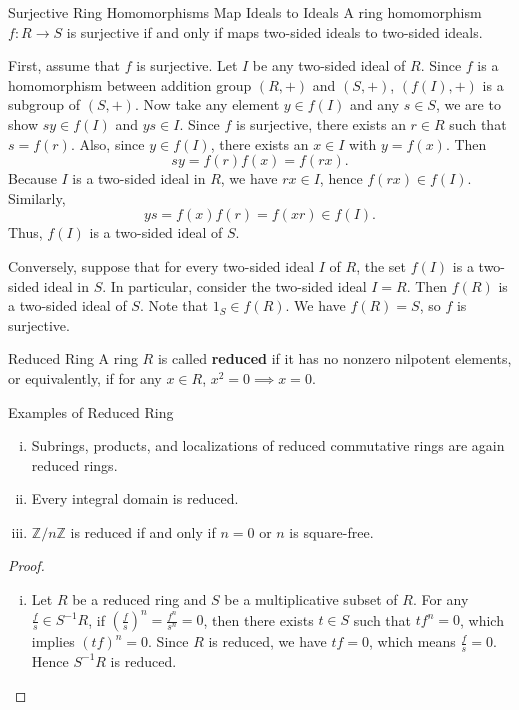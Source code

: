 \begin{proposition}{Surjective Ring Homomorphisms Map Ideals to Ideals}{}
    A ring homomorphism $f:R\to S$ is surjective if and only if maps two-sided ideals to two-sided ideals.
\end{proposition}
\begin{prf}
    First, assume that \( f \) is surjective. Let \( I \) be any two-sided ideal of \( R \). Since $f$ is a homomorphism between addition group $(R,+)$ and $(S,+)$, $(f(I),+)$ is a subgroup of $(S,+)$. Now take any element \( y \in f(I) \) and any \( s \in S \), we are to show $sy\in f(I)$ and $ys\in I$. Since \( f \) is surjective, there exists an \( r \in R \) such that \( s = f(r) \). Also, since \( y \in f(I) \), there exists an \( x \in I \) with \( y = f(x) \). Then
\[
s y = f(r) f(x) = f(rx).
\]
Because \( I \) is a two-sided ideal in \( R \), we have \( rx \in I \), hence \( f(rx) \in f(I) \). Similarly,
\[
y s = f(x) f(r) = f(xr) \in f(I).
\]
Thus, \( f(I) \) is a two-sided ideal of \( S \).

Conversely, suppose that for every two-sided ideal \( I \) of \( R \), the set \( f(I) \) is a two-sided ideal in \( S \). In particular, consider the two-sided ideal \( I = R \). Then \( f(R) \) is a two-sided ideal of \( S \). Note that \(1_S\in f(R) \). We have \( f(R) = S \), so \( f \) is surjective.

\end{prf}



\begin{definition}{Reduced Ring}{}
    A ring $R$ is called \textbf{reduced} if it has no nonzero nilpotent elements, or equivalently, if for any $x\in R$, $x^2=0\implies x=0$.
\end{definition}


\begin{proposition}{Examples of Reduced Ring}{}
    \begin{enumerate}[(i)]
        \item Subrings, products, and localizations of reduced commutative rings are again reduced rings.
        \item Every integral domain is reduced.
        \item $\mathbb{Z}/n\mathbb{Z}$ is reduced if and only if $n=0$ or $n$ is square-free.
    \end{enumerate}
\end{proposition}
\begin{proof}
    \begin{enumerate}[(i)]
        \item Let $R$ be a reduced ring and $S$ be a  multiplicative subset of $R$. For any $\frac{f}{s}\in S^{-1}R$, if $\left(\frac{f}{s}\right)^n=\frac{f^n}{s^n}=0$, then there exists $t\in S$ such that $tf^n=0$, which implies $(tf)^n=0$. Since $R$ is reduced, we have $tf=0$, which means $\frac{f}{s}=0$. Hence $S^{-1}R$ is reduced.
    \end{enumerate}
\end{proof}


